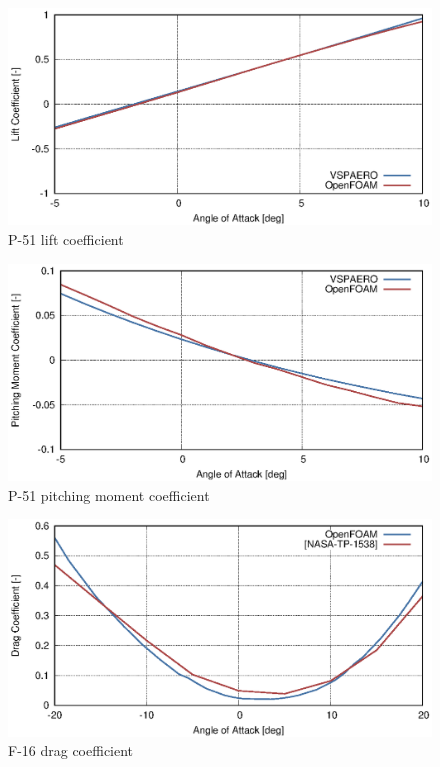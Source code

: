 \begin{figure}
  \centering
  \includegraphics[width=140mm]{eps/vspaero_p51_cz.eps}
  \caption{P-51 lift coefficient}
  \label{fig-cfd-result-vspaero-cz}
\end{figure}

\begin{figure}
  \centering
  \includegraphics[width=140mm]{eps/vspaero_p51_cm.eps}
  \caption{P-51 pitching moment coefficient}
  \label{fig-cfd-result-vspaero-cm}
\end{figure}

\begin{figure}
  \centering
  \includegraphics[width=140mm]{eps/openfoam_f16_cx.eps}
  \caption{F-16 drag coefficient}
  \label{fig-cfd-result-openfoam-cx}
\end{figure}

